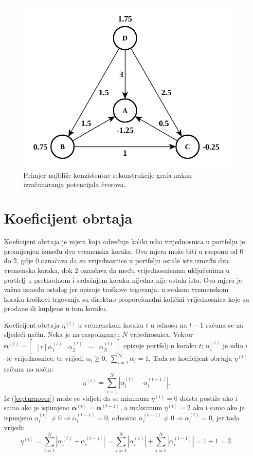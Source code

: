 \documentclass[lmodern, utf8, diplomski, numeric]{fer}
\newcommand{\matr}[1]{\mathbold{#1}}
\newcommand{\q}{\left}
\newcommand{\w}{\right}
\begin{document}
  \begin{figure}[h]
    \centering
    \includegraphics[width=0.619\linewidth]{graphics/graph-eg-2.pdf}
    \caption{Primjer najbliže konzistentne rekonstrukcije grafa nakon izračunavanja potencijala čvorova.}
    \label{fig:graph-eg-2}
  \end{figure}
  
  \section{Koeficijent obrtaja}
  \label{sc:turnover}
  Koeficijent obrtaja  je mjera koja određuje koliki udio vrijednosnica u portfelju je promijenjen između dva vremenska koraka.
  Ova mjera može biti u rasponu od 0 do 2, gdje 0 označava da su vrijednosnice u portfelju ostale iste između dva vremenska koraka, dok 2 označava da među vrijednosnicama uključenima u portfelj u prethodnom i sadašnjem koraku nijedna nije ostala ista.
  Ova mjera je važna između ostalog jer opisuje troškove trgovanja: u svakom vremenskom koraku troškovi trgovanja su direktno proporcionalni količini vrijednosnica koje su prodane ili kupljene u tom koraku.
  
  Koeficijent obrtaja $\eta^{(t)}$ u vremenskom koraku $t$ u odnosu na $t-1$ računa se na sljedeći način.
  Neka je na raspolaganju $N$ vrijednosnica.
  Vektor $\matr{\alpha}^{(t)} = \begin{bmatrix*}[r] \alpha_1^{(t)} & \alpha_2^{(t)} & \cdots & \alpha_N^{(t)} \end{bmatrix*}$ opisuje portfelj u koraku $t$; $\alpha_i^{(t)}$ je udio $i$-te vrijednosnice, te vrijedi $\alpha_i \ge 0,\ \sum_{i=1}^{N} \alpha_i = 1$.
  Tada se koeficijent obrtaja $\eta^{(t)}$ računa na način:
  \begin{equation}
  \label{eq:turnover}
  \eta^{(t)} = \sum_{i=1}^{N} \q \lvert \alpha_i^{(t)} - \alpha_i^{(t-1)} \w \rvert.
  \end{equation}
  Iz (\ref{eq:turnover}) može se vidjeti da se minimum $\eta^{(t)} = 0$ doista postiže ako i samo ako je ispunjeno $\matr{\alpha}^{(t)} = \matr{\alpha}^{(t-1)}$,
  a maksimum $\eta^{(t)} = 2$ ako i samo ako je ispunjeno $\alpha_i^{(t)} \ne 0 \Rightarrow \alpha_i^{(t - 1)} = 0$, odnosno $\alpha_i^{(t - 1)} \ne 0 \Rightarrow \alpha_i^{(t)} = 0$, jer tada vrijedi: 
  \begin{equation*}
  \eta^{(t)} = \sum_{i=1}^{N} \q \lvert \alpha_i^{(t)} - \alpha_i^{(t-1)} \w \rvert = \sum_{i=1}^{N} \q \lvert \alpha_i^{(t)}\w \rvert + \sum_{i=1}^N \q \lvert\alpha_i^{(t-1)} \w \rvert = 1 + 1 = 2.
  \end{equation*}
  
\end{document}
